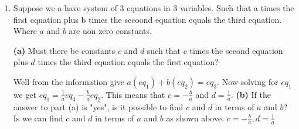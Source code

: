 \documentclass[10pt]{article}
\begin{document}
\begin{enumerate}
\begin{minipage}[t]{0.5\linewidth}
            Add the third and the second equation to get $a-3c=13$. Now from the first equation we can see that $a=9+2c$. Subsitute this to get $9+2c-3c=13$ $$-c=4, c=-4$$
            Now substitute $c$ into the last equation to get
            \begin{align*}
              28+d=26 \\
              d=-2 
            \end{align*}
            \centerline{$\boxed{(a,b,c,d)=(1,3,-4,-2)}$}
          \end{minipage}
          \begin{minipage}[t]{0.5\linewidth}
            $\begin{cases}
              x_1+x_2+x_3+x_4=1 \\
              x_1+x_2-x_3=2 \\
              x_2+x_3=0
            \end{cases}$
            


            From the last equation we can see that $x_2=-x_3$
            Now substitute this into all of the equations we get

            $\begin{cases}
              x_1+x_4=1 \\
              x_1-2x_3=2 \\
            \end{cases}$

            THis results in 3 variables and 2 equations. This means that the system has infinite solutions. We can solve for $x_1$ in terms of $x_3$ and $x_4$.
            From the second equation we can see that $x_1=2+2x_3$. Substitute this into the first equation to get $2+2x_3+x_4=1$ $$x_4=-1-2x_3$$

            Now we have all of the variables in terms of $x_3$\\
            $\boxed{(x_1,x_2,x_3,x_4)=(2+2x_3,-x_3,x_3,-1-2x_3)}$
          \end{minipage}
        

        \item Suppose we a have system of 3 equations in 3 variables. Such that a times the first equation plus b times the secoond equation equals the third equation. Where $a$ and $b$ are non zero constants.
          
          \textbf{(a)} \quad
          Must there be constants $c$ and $d$ such that $c$ times the second equation plus $d$ times the third equation equals the first equation?


          Well from the information give $a(eq_1)+b(eq_2)=eq_3$. Now solving for $eq_1$ we get $eq_1=\frac{1}{a}eq_3-\frac{b}{a}eq_2$. This means that $c=-\frac{b}{a}$ and $d=\frac{1}{a}$.
          \textbf{(b)} \quad
          If the answer to part (a) is "yes", is it possible to find $c$ and $d$ in terms of $a$ and $b$?
          Is we can find $c$ and $d$ in terms of $a$ and $b$ as shown above. $\boxed{c=-\frac{b}{a},d=\frac{1}{a}}$

    \end{enumerate}
\end{document}
